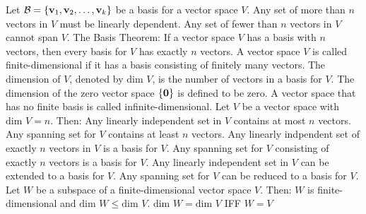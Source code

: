 \documentclass{article}
\begin{document}
\begin{outline}
        \1 Let \(\mathcal B=\{\vb v_1,\vb v_2,\ldots,\vb v_k\}\) be a basis for a vector space $V$. 
            \2 Any set of more than $n$ vectors in $V$ must be linearly dependent. 
            \2 Any set of fewer than $n$ vectors in $V$ cannot span $V$. 
        \1 The Basis Theorem: If a vector space $V$ has a basis with $n$ vectors, then every basis for $V$ has exactly $n$ vectors. 
        \1 A vector space $V$ is called finite-dimensional if it has a basis consisting of finitely many vectors. The dimension of $V$, denoted by \(\text{dim }V\), is the number of vectors in a basis for $V$. The dimension of the zero vector space \(\{\vb 0\}\) is defined to be zero. A vector space that has no finite basis is called infinite-dimensional. 
        \1 Let $V$ be a vector space with \(\text{dim }V=n\). Then: 
            \2 Any linearly independent set in $V$ contains at most $n$ vectors. 
            \2 Any spanning set for $V$ contains at least $n$ vectors. 
            \2 Any linearly indpendent set of exactly $n$ vectors in $V$ is a basis for $V$. 
            \2 Any spanning set for $V$ consisting of exactly $n$ vectors is a basis for $V$. 
            \2 Any linearly independent set in $V$ can be extended to a basis for $V$. 
            \2 Any spanning set for $V$ can be reduced to a basis for $V$. 
        \1 Let $W$ be a subspace of a finite-dimensional vector space $V$. Then: 
            \2 $W$ is finite-dimensional and \(\text{dim }W\leq\text{dim }V\). 
            \2 \(\text{dim }W=\text{dim }V\) IFF \(W=V\)
    \end{outline}
\end{document}
